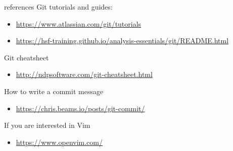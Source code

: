 \begin{frame}[fragile]{references}
    Git tutorials and guides:
    \begin{itemize}
        \item \url{https://www.atlassian.com/git/tutorials}
        \item \url{https://hsf-training.github.io/analysis-essentials/git/README.html}
    \end{itemize}
    Git cheatsheet
    \begin{itemize}
        \item \url{http://ndpsoftware.com/git-cheatsheet.html}
    \end{itemize}
    How to write a commit message
    \begin{itemize}
        \item \url{https://chris.beams.io/posts/git-commit/}
    \end{itemize}
    If you are interested in Vim
    \begin{itemize}
        \item \url{https://www.openvim.com/}
    \end{itemize}
    
  \end{frame}